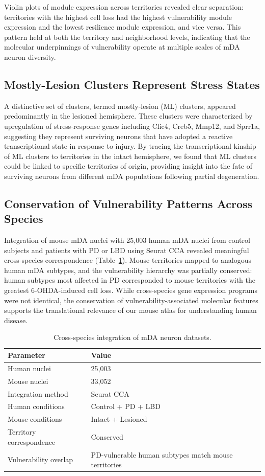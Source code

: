 \documentclass[12pt]{article}
\begin{document}
Violin plots of module expression across territories revealed clear separation: territories with the highest cell loss had the highest vulnerability module expression and the lowest resilience module expression, and vice versa. This pattern held at both the territory and neighborhood levels, indicating that the molecular underpinnings of vulnerability operate at multiple scales of mDA neuron diversity.

\subsection{Mostly-Lesion Clusters Represent Stress States}

A distinctive set of clusters, termed mostly-lesion (ML) clusters, appeared predominantly in the lesioned hemisphere. These clusters were characterized by upregulation of stress-response genes including Clic4, Creb5, Mmp12, and Sprr1a, suggesting they represent surviving neurons that have adopted a reactive transcriptional state in response to injury. By tracing the transcriptional kinship of ML clusters to territories in the intact hemisphere, we found that ML clusters could be linked to specific territories of origin, providing insight into the fate of surviving neurons from different mDA populations following partial degeneration.

\subsection{Conservation of Vulnerability Patterns Across Species}

Integration of mouse mDA nuclei with 25,003 human mDA nuclei from control subjects and patients with PD or LBD using Seurat CCA revealed meaningful cross-species correspondence (Table~\ref{tab:integration}). Mouse territories mapped to analogous human mDA subtypes, and the vulnerability hierarchy was partially conserved: human subtypes most affected in PD corresponded to mouse territories with the greatest 6-OHDA-induced cell loss. While cross-species gene expression programs were not identical, the conservation of vulnerability-associated molecular features supports the translational relevance of our mouse atlas for understanding human disease.

\begin{table}[ht]
\centering
\caption{Cross-species integration of mDA neuron datasets.}
\label{tab:integration}
\begin{tabular}{ll}
\toprule
Parameter & Value \\
\midrule
Human nuclei & 25,003 \\
Mouse nuclei & 33,052 \\
Integration method & Seurat CCA \\
Human conditions & Control + PD + LBD \\
Mouse conditions & Intact + Lesioned \\
Territory correspondence & Conserved \\
Vulnerability overlap & PD-vulnerable human subtypes match mouse territories \\
\bottomrule
\end{tabular}
\end{table}
\end{document}
